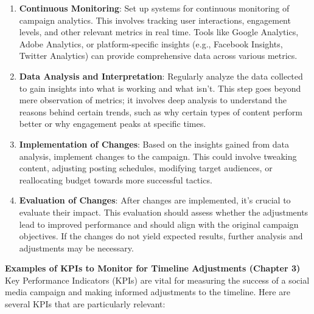 \documentclass[
]{book}
\begin{document}
\begin{enumerate}
\def\labelenumi{\arabic{enumi}.}
\item
  \textbf{Continuous Monitoring}: Set up systems for continuous monitoring of campaign analytics. This involves tracking user interactions, engagement levels, and other relevant metrics in real time. Tools like Google Analytics, Adobe Analytics, or platform-specific insights (e.g., Facebook Insights, Twitter Analytics) can provide comprehensive data across various metrics.
\item
  \textbf{Data Analysis and Interpretation}: Regularly analyze the data collected to gain insights into what is working and what isn't. This step goes beyond mere observation of metrics; it involves deep analysis to understand the reasons behind certain trends, such as why certain types of content perform better or why engagement peaks at specific times.
\item
  \textbf{Implementation of Changes}: Based on the insights gained from data analysis, implement changes to the campaign. This could involve tweaking content, adjusting posting schedules, modifying target audiences, or reallocating budget towards more successful tactics.
\item
  \textbf{Evaluation of Changes}: After changes are implemented, it's crucial to evaluate their impact. This evaluation should assess whether the adjustments lead to improved performance and should align with the original campaign objectives. If the changes do not yield expected results, further analysis and adjustments may be necessary.
\end{enumerate}

\textbf{Examples of KPIs to Monitor for Timeline Adjustments (Chapter 3)}
Key Performance Indicators (KPIs) are vital for measuring the success of a social media campaign and making informed adjustments to the timeline. Here are several KPIs that are particularly relevant:
\end{document}
